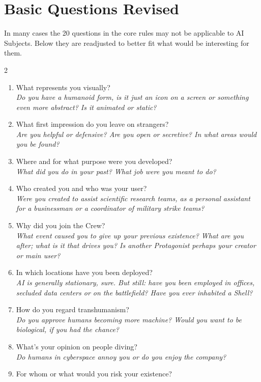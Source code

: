 \documentclass[12pt,a4paper,openany,usenames,dvipsnames]{book}
\begin{document}
	\section{Basic Questions Revised}
	In many cases the 20 questions in the core rules may not be applicable to AI Subjects.
	Below they are readjusted to better fit what would be interesting for them.
	\begin{multicols}{2}
	\begin{enumerate}
		\setlength\itemsep{-6mm}
		\item What represents you visually?\\
		\textit{Do you have a humanoid form, is it just an icon on a screen or something even more abstract? Is it animated or static?}
		\item What first impression do you leave on strangers?\\
		\textit{Are you helpful or defensive? Are you open or secretive? In what areas would you be found?}
		\item Where and for what purpose were you developed?\\
		\textit{What did you do in your past? What job were you meant to do?}
		\item Who created you and who was your user?\\
		\textit{Were you created to assist scientific research teams, as a personal assistant for a businessman or a coordinator of military strike teams?}
		\item Why did you join the Crew?\\
		\textit{What event caused you to give up your previous existence? What are you after; what is it that drives you? Is another Protagonist perhaps your creator or main user?}
		\item In which locations have you been deployed?\\
		\textit{AI is generally stationary, sure. But still: have you been employed in offices, secluded data centers or on the battlefield? Have you ever inhabited a Shell?}
		\item How do you regard transhumanism?\\
		\textit{Do you approve humans becoming more machine? Would you want to be biological, if you had the chance?}
		\item What’s your opinion on people diving?\\
		\textit{Do humans in cyberspace annoy you or do you enjoy the company?}
		\item For whom or what would you risk your existence?\\

\end{enumerate}
\end{multicols}
\end{document}
